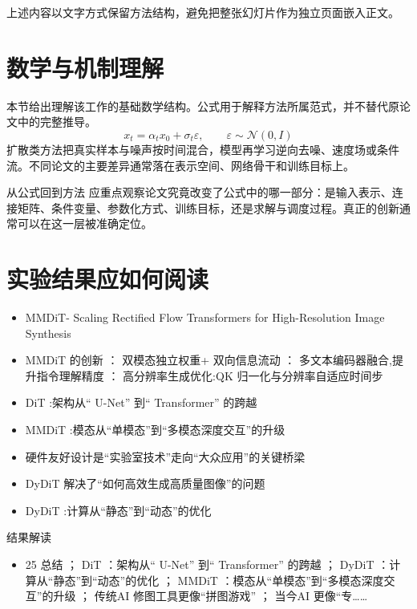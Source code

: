 \documentclass[UTF8,11pt,a4paper]{ctexart}
\begin{document}
上述内容以文字方式保留方法结构，避免把整张幻灯片作为独立页面嵌入正文。

\section{数学与机制理解}
本节给出理解该工作的基础数学结构。公式用于解释方法所属范式，并不替代原论文中的完整推导。
\begin{equation}
x_t=\alpha_t x_0+\sigma_t\varepsilon,\qquad \varepsilon\sim\mathcal N(0,I)
\end{equation}
扩散类方法把真实样本与噪声按时间混合，模型再学习逆向去噪、速度场或条件流。不同论文的主要差异通常落在表示空间、网络骨干和训练目标上。

\begin{keybox}{从公式回到方法}
应重点观察论文究竟改变了公式中的哪一部分：是输入表示、连接矩阵、条件变量、参数化方式、训练目标，还是求解与调度过程。真正的创新通常可以在这一层被准确定位。
\end{keybox}


\section{实验结果应如何阅读}
\begin{itemize}
\item MMDiT- Scaling Rectified Flow Transformers for High-Resolution Image Synthesis
\item MMDiT 的创新 ： 双模态独立权重+ 双向信息流动 ： 多文本编码器融合,提升指令理解精度 ： 高分辨率生成优化:QK 归一化与分辨率自适应时间步
\item DiT :架构从“ U-Net” 到“ Transformer” 的跨越
\item MMDiT :模态从“单模态”到“多模态深度交互”的升级
\item 硬件友好设计是“实验室技术”走向“大众应用”的关键桥梁
\item DyDiT 解决了“如何高效生成高质量图像”的问题
\item DyDiT :计算从“静态”到“动态”的优化
\end{itemize}

\begin{notebox}{结果解读}
\begin{itemize}
\item 25 总结 ； DiT ：架构从“ U-Net” 到“ Transformer” 的跨越 ； DyDiT ：计算从“静态”到“动态”的优化 ； MMDiT ：模态从“单模态”到“多模态深度交互”的升级 ； 传统AI 修图工具更像“拼图游戏” ； 当今AI 更像“专……
\end{itemize}
\end{notebox}
\end{document}
